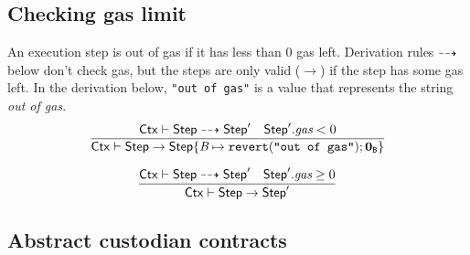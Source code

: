 \documentclass[12pt]{extarticle}
\begin{document}
\subsection{Checking gas limit}
An execution step is out of gas if it has less than $0$ gas left. Derivation rules $\dashrightarrow$ below don't check gas, but the steps are only valid ($\rightarrow$) if the step has some gas left. In the derivation below, \texttt{"out of gas"} is a value that represents the string \emph{out of gas}.
\begin{equation}
\dfrac{
\mathsf{Ctx}\vdash\mathsf{Step}\dashrightarrow \mathsf{Step}' \quad \mathsf{Step}'.\textit{gas} < 0
}{
\mathsf{Ctx}\vdash\mathsf{Step}\to \mathsf{Step}\{\textit{B}\mapsto \mathtt{revert}(\texttt{"out of gas"});\mathbf{0}_{\texttt{B}}\}
}
\end{equation}

\begin{equation}
\dfrac{
\mathsf{Ctx}\vdash\mathsf{Step}\dashrightarrow \mathsf{Step}' \quad \mathsf{Step}'.\textit{gas} \geq 0
}{
\mathsf{Ctx}\vdash\mathsf{Step}\to \mathsf{Step}'
}
\end{equation}

\newpage 

\newpage

\newpage



\subsection{Abstract custodian contracts}
\end{document}
